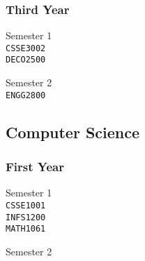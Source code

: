 \subsubsection{Third Year}
\begin{center}
\begin{multicols}{2}
Semester 1 \\
\texttt{CSSE3002} \\
\texttt{DECO2500} \\
\vfill
\columnbreak

Semester 2 \\
\texttt{ENGG2800} \\
\end{multicols}
\end{center}

\subsection{Computer Science}

\subsubsection{First Year}
\begin{center}
\begin{multicols}{2}
Semester 1 \\
\texttt{CSSE1001} \\
\texttt{INFS1200} \\
\texttt{MATH1061} \\
\vfill
\columnbreak

Semester 2 \\
\end{multicols}
\end{center}
